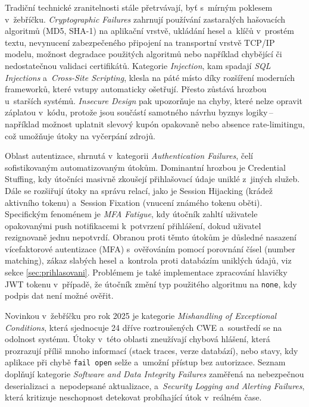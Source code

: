 Tradiční technické zranitelnosti stále přetrvávají, byť s~mírným poklesem v~žebříčku.
\emph{Cryptographic Failures} zahrnují používání zastaralých hašovacích algoritmů (MD5, SHA-1) na aplikační vrstvě, ukládání hesel a~klíčů v~prostém textu, nevynucení zabezpečeného připojení na transportní vrstvě TCP/IP modelu, možnost degradace použitých algoritmů nebo například chybějící či nedostatečnou validaci certifikátů.
Kategorie \emph{Injection}, kam spadají \emph{SQL Injections} a~\emph{Cross-Site Scripting}, klesla na páté místo díky rozšíření moderních frameworků, které vstupy automaticky ošetřují.
Přesto zůstává hrozbou u~starších systémů.
\emph{Insecure Design} pak upozorňuje na chyby, které nelze opravit záplatou v~kódu, protože jsou součástí samotného návrhu byznys logiky\,--\,například možnost uplatnit slevový kupón opakovaně nebo absence rate-limitingu, což umožňuje útoky na vyčerpání zdrojů.

Oblast autentizace, shrnutá v~kategorii \emph{Authentication Failures}, čelí sofistikovaným automatizovaným útokům.
Dominantní hrozbou je Credential Stuffing, kdy útočníci masivně zkoušejí přihlašovací údaje uniklé z~jiných služeb.
Dále se rozšiřují útoky na správu relací, jako je Session Hijacking (krádež aktivního tokenu) a~Session Fixation (vnucení známého tokenu oběti).
Specifickým fenoménem je \emph{MFA Fatigue}, kdy útočník zahltí uživatele opakovanými push notifikacemi k~potvrzení přihlášení, dokud uživatel rezignovaně jednu nepotvrdí.
Obranou proti těmto útokům je důsledné nasazení vícefaktorové autentizace (MFA) s~ověřováním pomocí porovnání čísel (number matching), zákaz slabých hesel a~kontrola proti databázím uniklých údajů, viz sekce \ref{sec:prihlasovani}.
Problémem je také implementace zpracování hlavičky JWT tokenu v~případě, že útočník změní typ použitého algoritmu na \texttt{none}, kdy podpis dat není možné ověřit.

Novinkou v~žebříčku pro rok 2025 je kategorie \emph{Mishandling of Exceptional Conditions}, která sjednocuje 24 dříve roztroušených CWE a~soustředí se na odolnost systému.
Útoky v~této oblasti zneužívají chybová hlášení, která prozrazují příliš mnoho informací (stack traces, verze databází), nebo stavy, kdy aplikace při chybě \texttt{fail open} selže a~umožní přístup bez autorizace.
Seznam doplňují kategorie \emph{Software and Data Integrity Failures} zaměřená na nebezpečnou deserializaci a~nepodepsané aktualizace, a~\emph{Security Logging and Alerting Failures}, která kritizuje neschopnost detekovat probíhající útok v~reálném čase.
